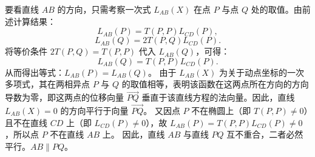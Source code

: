 \begin{solution}
要看直线 $AB$ 的方向，只需考察一次式 $L_{AB}(X)$ 在点 $P$ 与点 $Q$ 处的取值。由前述计算结果：
\[ L_{AB}(P) = T(P, P)L_{CD}(P), \]
\[ L_{AB}(Q) = 2T(P, Q)L_{CD}(P). \]
将等价条件 $2T(P, Q) = T(P, P)$ 代入 $L_{AB}(Q)$，可得：
\[ L_{AB}(Q) = T(P, P)L_{CD}(P). \]
从而得出等式：$L_{AB}(P) = L_{AB}(Q)$。
由于 $L_{AB}(X)$ 为关于动点坐标的一次多项式，其在两相异点 $P$ 与 $Q$ 的取值相等，表明该函数在这两点所在方向的方向导数为零，即这两点的位移向量 $\overrightarrow{PQ}$ 垂直于该直线方程的法向量。因此，直线 $L_{AB}(X) = 0$ 的方向平行于向量 $\overrightarrow{PQ}$。
又因点 $P$ 不在椭圆上（即 $T(P, P) \neq 0$）且不在直线 $CD$ 上（即 $L_{CD}(P) \neq 0$），故 $L_{AB}(P) = T(P, P)L_{CD}(P) \neq 0$，所以点 $P$ 不在直线 $AB$ 上。
因此，直线 $AB$ 与直线 $PQ$ 互不重合，二者必然平行。$AB \parallel PQ$。
\end{solution}

